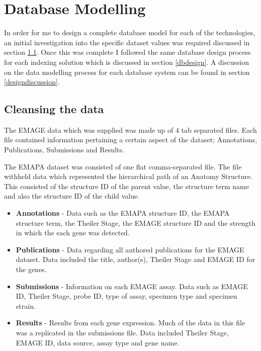 \chapter{Database Modelling}\label{design}
In order for me to design a complete database model for each of the technologies, an initial investigation into the specific dataset values was required discussed in section \ref{datasetvalues}. Once this was complete I followed the same database design process for each indexing solution which is discussed in section \ref{dbdesign}. A discussion on the data modelling process for each database system can be found in section \ref{designdiscussion}.

\section{Cleansing the data}\label{datasetvalues}

The EMAGE data which was supplied was made up of 4 tab separated files. Each file contained information pertaining a certain aspect of the dataset; Annotations, Publications, Submissions and Results.

The EMAPA dataset was consisted of one flat comma-separated file. The file withheld data which represented the hierarchical path of an Anatomy Structure. This consisted of the structure ID of the parent value, the structure term name and also the structure ID of the child value.

\begin{itemize}
\item \textbf{Annotations} - Data such as the EMAPA structure ID, the EMAPA structure term, the Theiler Stage, the EMAGE structure ID and the strength in which the each gene was detected.

\item \textbf{Publications} - Data regarding all authored publications for the EMAGE dataset. Data included the title, author(s), Theiler Stage and EMAGE ID for the genes.

\item \textbf{Submissions} - Information on each EMAGE assay. Data such as EMAGE ID, Theiler Stage, probe ID, type of assay, specimen type and specimen strain.

\item \textbf{Results} - Results from each gene expression. Much of the data in this file was a replicated in the submissions file. Data included Theiler Stage, EMAGE ID, data source, assay type and gene name.
\end{itemize}

